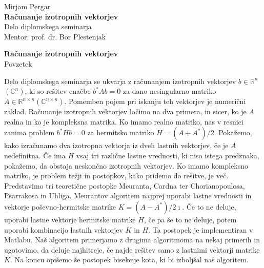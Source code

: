 \documentclass[12pt,a4paper]{amsart}
\theoremstyle{definition}
\theoremstyle{plain}
\newcommand{\R}{\mathbb R}
\newcommand{\C}{\mathbb C}
\begin{document}
\thispagestyle{empty}
\vfill

\begin{center}{\large
Mirjam Pergar\\[2mm]
{\bf Računanje izotropnih vektorjev}\\[10mm]
Delo diplomskega seminarja\\[1cm]
Mentor: prof. dr. Bor Plestenjak}
\end{center}
\vfill

\pagebreak

\thispagestyle{empty}
\tableofcontents
\pagebreak

\thispagestyle{empty}
\begin{center}
{\bf Računanje izotropnih vektorjev}\\[3mm]
{\sc Povzetek}
\end{center}
Delo diplomskega seminarja se ukvarja z računanjem izotropnih vektorjev $b\in\R^{n}$ $(\C^{n})$, ki so rešitev enačbe $b^\ast Ab=0$ za dano nesingularno matriko $A\in\R^{n\times n} (\C^{n\times n}).$
Pomemben pojem pri iskanju teh vektorjev je numerični zaklad. %
Računanje izotropnih vektorjev ločimo na dva primera, in sicer, ko je $A$ realna in ko je kompleksna matrika.
Ko imamo realno matriko, nas v resnici zanima problem $b^\ast Hb=0$ za hermitsko matriko $H=(A+A^\ast)/2$. 
Pokažemo, kako izračunamo dva izotropna vektorja iz dveh lastnih vektorjev, če je $A$ nedefinitna. Če ima $H$ vsaj tri različne lastne vrednosti, ki niso istega predznaka, pokažemo, da obstaja neskončno izotropnih vektorjev.
Ko imamo kompleksno matriko, je problem težji in postopkov, kako pridemo do rešitve, je več. Predstavimo tri teoretične postopke Meuranta, Cardna ter Chorianopoulosa, Psarrakosa in Uhliga.
Meurantov algoritem najprej uporabi lastne vrednosti in vektorje poševno-hermitske matrike $K=(A-A^\ast)/2\imath.$ Če to ne deluje, uporabi lastne vektorje hermitske matrike $H$, če pa še to ne deluje, potem uporabi kombinacijo lastnih vektorjev $K$ in $H$.
Ta postopek je implementiran v Matlabu.
Naš algoritem primerjamo z drugima algoritmoma na nekaj primerih in ugotovimo, da deluje najhitreje, če najde rešitev samo z lastnimi vektorji matrike $K$. %
Na koncu opišemo še postopek bisekcije kota, ki bi izboljšal naš algoritem.
\end{document}
